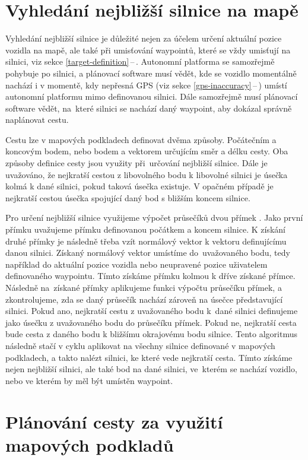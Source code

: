 \documentclass[czech, bachelor]{diploma}
\newcommand{\filipref}[1]{\ref{#1}\,--\,\nameref{#1}}
\begin{document}
\section{Vyhledání nejbližší silnice na mapě}

Vyhledání nejbližší silnice je důležité nejen za účelem určení aktuální pozice vozidla na mapě, ale také při umisťování waypointů,
které se vždy umisťují na silnici, viz sekce \filipref{target-definition}. Autonomní platforma se samozřejmě pohybuje po silnici,
a plánovací software musí vědět, kde se vozidlo momentálně nachází i v momentě, kdy nepřesná GPS (viz sekce
\filipref{gps-inaccuracy}) umístí autonomní platformu mimo definovanou silnici. Dále samozřejmě musí plánovací software vědět,
na~které silnici se nachází daný waypoint, aby dokázal správně naplánovat cestu.

Cestu lze v mapových podkladech definovat dvěma způsoby. Počátečním a koncovým bodem, nebo bodem a vektorem určujícím směr a délku
cesty. Oba způsoby definice cesty jsou využity při~určování nejbližší silnice. Dále je uvažováno, že nejkratší cestou
z libovolného bodu k libovolné silnici je úsečka kolmá k dané silnici, pokud taková úsečka existuje. V opačném případě
je nejkratší cestou úsečka spojující daný bod s bližším koncem silnice.

Pro určení nejbližší silnice využijeme výpočet průsečíků dvou přímek \cite{line-line-intersection-source}.
Jako první přímku uvažujeme přímku definovanou počátkem a koncem silnice. K získání druhé přímky je následně třeba vzít normálový
vektor k vektoru definujícímu danou silnici. Získaný normálový vektor umístíme do~uvažovaného bodu, tedy například do aktuální
pozice vozidla nebo neupravené pozice uživatelem definovaného waypointu. Tímto získáme přímku kolmou k dříve získané přímce.
Následně na~získané přímky aplikujeme funkci výpočtu průsečíku přímek, a zkontrolujeme, zda se daný průsečík nachází zároveň
na úsečce představující silnici. Pokud ano, nejkratší cestu z uvažovaného bodu k~dané silnici definujeme jako úsečku z uvažovaného
bodu do průsečíku přímek. Pokud ne, nejkratší cesta bude cesta z daného bodu k bližšímu okrajovému bodu silnice. Tento algoritmus
následně stačí v cyklu aplikovat na všechny silnice definované v mapových podkladech, a takto nalézt silnici, ke které vede
nejkratší cesta. Tímto získáme nejen nejbližší silnici, ale také bod na dané silnici, ve~kterém se nachází vozidlo, nebo ve kterém
by měl být umístěn waypoint.

\section{Plánování cesty za využití mapových podkladů}
\end{document}
